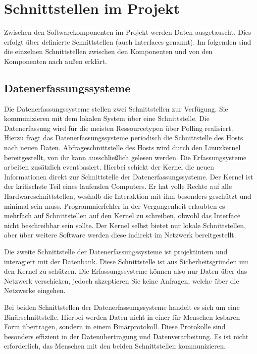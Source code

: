 \section{Schnittstellen im Projekt}
Zwischen den Softwarekomponenten im Projekt werden Daten ausgetauscht. Dies
erfolgt über definierte Schnittstellen (auch Interfaces genannt). Im folgenden
sind die einzelnen Schnittstellen zwischen den Komponenten und von den
Komponenten nach außen erklärt.
\tm%

\subsection{Datenerfassungssysteme}
Die Datenerfassungssysteme stellen zwei Schnittstellen zur Verfügung. Sie
kommunizieren mit dem lokalen System über eine
 Schnittstelle. Die Datenerfassung wird
für die meisten Ressourcetypen über Polling realisiert. Hierzu fragt das
Datenerfassungssysteme periodisch die Schnittstelle des Hosts nach neuen Daten.
Abfrageschnittstelle des Hosts wird durch den Linuxkernel bereitgestellt, von
ihr kann ausschließlich gelesen werden. Die Erfassungsysteme arbeiten
zusätzlich eventbasiert. Hierbei schickt der Kernel die neuen Informationen
direkt zur Schnittstelle der Datenerfassungssysteme. Der Kernel ist der
kritischste Teil eines laufenden Computers. Er hat volle Rechte auf alle
Hardwareschnittstellen, weshalb die Interaktion mit ihm besonders geschützt und
minimal sein muss. Programmierfehler in der Vergangenheit erlaubten es mehrfach
auf Schnittstellen auf den Kernel zu schreiben, obwohl das Interface nicht
beschreibbar sein sollte. Der Kernel selbst bietet nur lokale Schnittstellen,
aber über weitere Software werden diese indirekt im Netzwerk bereitgestellt.

Die zweite Schnittstelle der Datenerfassungssysteme ist projektintern und
interagiert mit der Datenbank. Diese Schnittstelle ist aus Sicherheitsgründen
 um den Kernel zu schützen. Die
Erfassungssysteme können also nur Daten über das Netzwerk verschicken, jedoch
akzeptieren Sie keine Anfragen, welche über die Netzwerke eingehen.

Bei beiden Schnittstellen der Datenerfassungssysteme handelt es sich um eine
Binärschnittstelle. Hierbei werden Daten nicht in einer für Menschen lesbaren
Form übertragen, sondern in einem Binärprotokoll. Diese Protokolle sind
besonders effizient in der Datenübertragung und Datenverarbeitung. Es ist nicht
erforderlich, das Menschen mit den beiden Schnittstellen kommunizieren.
\tm%

